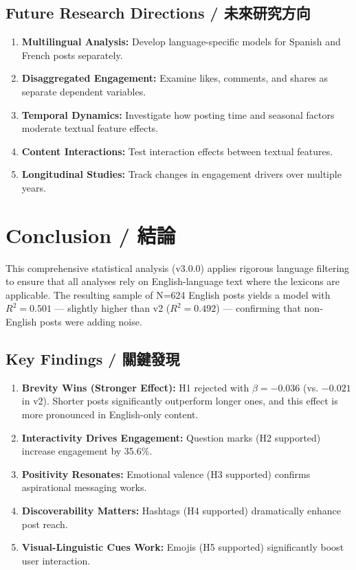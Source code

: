 \documentclass[12pt,a4paper]{article}
\begin{document}
\subsection{Future Research Directions / 未來研究方向}

\begin{enumerate}
    \item \textbf{Multilingual Analysis:} Develop language-specific models for Spanish and French posts separately.
    \item \textbf{Disaggregated Engagement:} Examine likes, comments, and shares as separate dependent variables.
    \item \textbf{Temporal Dynamics:} Investigate how posting time and seasonal factors moderate textual feature effects.
    \item \textbf{Content Interactions:} Test interaction effects between textual features.
    \item \textbf{Longitudinal Studies:} Track changes in engagement drivers over multiple years.
\end{enumerate}

\newpage

\section{Conclusion / 結論}

This comprehensive statistical analysis (v3.0.0) applies rigorous language filtering to ensure that all analyses rely on English-language text where the lexicons are applicable. The resulting sample of N=624 English posts yields a model with $R^2 = 0.501$ — slightly higher than v2 ($R^2 = 0.492$) — confirming that non-English posts were adding noise.

\subsection{Key Findings / 關鍵發現}

\begin{enumerate}
    \item \textbf{Brevity Wins (Stronger Effect):} H1 rejected with $\beta = -0.036$ (vs. $-0.021$ in v2). Shorter posts significantly outperform longer ones, and this effect is more pronounced in English-only content.

    \item \textbf{Interactivity Drives Engagement:} Question marks (H2 supported) increase engagement by 35.6\%.

    \item \textbf{Positivity Resonates:} Emotional valence (H3 supported) confirms aspirational messaging works.

    \item \textbf{Discoverability Matters:} Hashtags (H4 supported) dramatically enhance post reach.

    \item \textbf{Visual-Linguistic Cues Work:} Emojis (H5 supported) significantly boost user interaction.
\end{enumerate}
\end{document}
